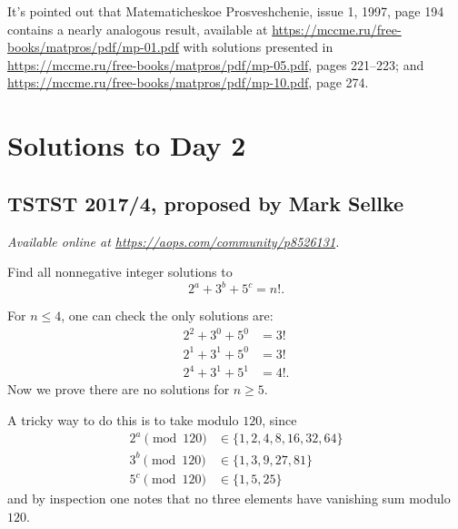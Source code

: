 \documentclass[11pt]{scrartcl}
\begin{document}
\begin{remark*}
  It's pointed out that Matematicheskoe Prosveshchenie, issue 1, 1997, page 194
  contains a nearly analogous result,
  available at \url{https://mccme.ru/free-books/matpros/pdf/mp-01.pdf}
  with solutions presented in \url{https://mccme.ru/free-books/matpros/pdf/mp-05.pdf},
  pages 221--223;
  and \url{https://mccme.ru/free-books/matpros/pdf/mp-10.pdf}, page 274.
\end{remark*}
\pagebreak

\section{Solutions to Day 2}
\subsection{TSTST 2017/4, proposed by Mark Sellke}
\textsl{Available online at \url{https://aops.com/community/p8526131}.}
\begin{mdframed}[style=mdpurplebox,frametitle={Problem statement}]
Find all nonnegative integer solutions to \[ 2^a + 3^b + 5^c = n!. \]
\end{mdframed}
For $n \le 4$, one can check the only solutions are:
\begin{align*}
  2^2 + 3^0 + 5^0 &= 3! \\
  2^1 + 3^1 + 5^0 &= 3! \\
  2^4 + 3^1 + 5^1 &= 4!.
\end{align*}
Now we prove there are no solutions for $n \ge 5$.

A tricky way to do this is to take modulo $120$, since
\begin{align*}
  2^a \pmod{120} &\in \{ 1, 2, 4, 8, 16, 32, 64 \} \\
  3^b \pmod{120} &\in \{ 1, 3, 9, 27, 81 \} \\
  5^c \pmod{120} &\in \{ 1, 5, 25 \}
\end{align*}
and by inspection one notes that no three
elements have vanishing sum modulo $120$.
\end{document}
